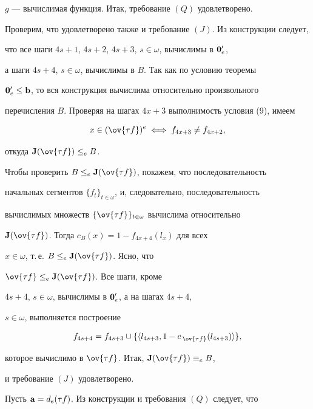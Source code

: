 $g$ --- вычислимая функция. Итак, требование $(Q)$ удовлетворено.





Проверим, что удовлетворено также и требование $(J)$. Из конструкции следует,


что все шаги $4s+1$, $4s+2$, $4s+3$, $s\in\omega$, вычислимы в ${\bold 0}_e'$,


а шаги $4s+4$, $s\in\omega$, вычислимы в $B$. Так как по условию теоремы


${\bold 0}_e'\leq{\bold b}$, то вся конструкция вычислима относительно произвольного


перечисления $B$. Проверяя на шагах $4x+3$ выполнимость условия (9), имеем


$$


x\in(\ov{\tau f})^e\iff f_{4x+3}\neq f_{4x+2},


$$


откуда ${\bold J}(\ov{\tau f})\leq_eB$.





Чтобы проверить $B\leq_e{\bold J}(\ov{\tau f})$, покажем, что последовательность


начальных сегментов $\{f_t\}_{t\in\omega}$, и, следовательно, последовательность


вычислимых множеств $\{\ov{\tau f}\}_{t\in\omega}$ вычислима относительно


${\bold J}(\ov{\tau f})$. Тогда $c_B(x)=1-f_{4x+4}(l_x)$ для всех


$x\in\omega$, т.\,е. $B\leq_e{\bold J}(\ov{\tau f})$. Ясно, что


$\ov{\tau f}\leq_e{\bold J}(\ov{\tau f})$. Все шаги, кроме


$4s+4$, $s\in\omega$, вычислимы в ${\bold 0}_e'$, а на шагах $4s+4$,


$s\in\omega$, выполняется построение


$$


f_{4s+4}=f_{4s+3}\cup\{\langle l_{4s+3},1-c\,_{\ov{\tau f}}(l_{4s+3})\rangle\},


$$


которое вычислимо в $\ov{\tau f}$. Итак, ${\bold J}(\ov{\tau f})\equiv_eB$,


и требование $(J)$ удовлетворено.





Пусть ${\bold a}=d_e(\tau f)$. Из конструкции и требования $(Q)$ следует, что


